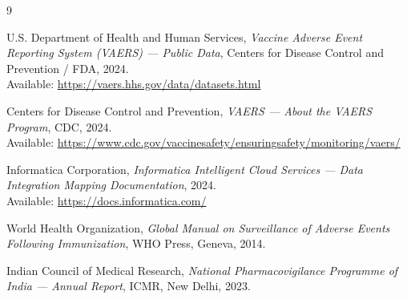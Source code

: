 \documentclass[12pt,a4paper]{report}
\begin{document}
\begin{thebibliography}{9}

U.S. Department of Health and Human Services,
\textit{Vaccine Adverse Event Reporting System (VAERS) — Public Data},
Centers for Disease Control and Prevention / FDA, 2024. \\
Available: \url{https://vaers.hhs.gov/data/datasets.html}

Centers for Disease Control and Prevention,
\textit{VAERS — About the VAERS Program}, CDC, 2024. \\
Available: \url{https://www.cdc.gov/vaccinesafety/ensuringsafety/monitoring/vaers/}

Informatica Corporation,
\textit{Informatica Intelligent Cloud Services — Data Integration Mapping Documentation}, 2024. \\
Available: \url{https://docs.informatica.com/}

World Health Organization,
\textit{Global Manual on Surveillance of Adverse Events Following Immunization},
WHO Press, Geneva, 2014.

Indian Council of Medical Research,
\textit{National Pharmacovigilance Programme of India — Annual Report},
ICMR, New Delhi, 2023.

\end{thebibliography}
\end{document}
